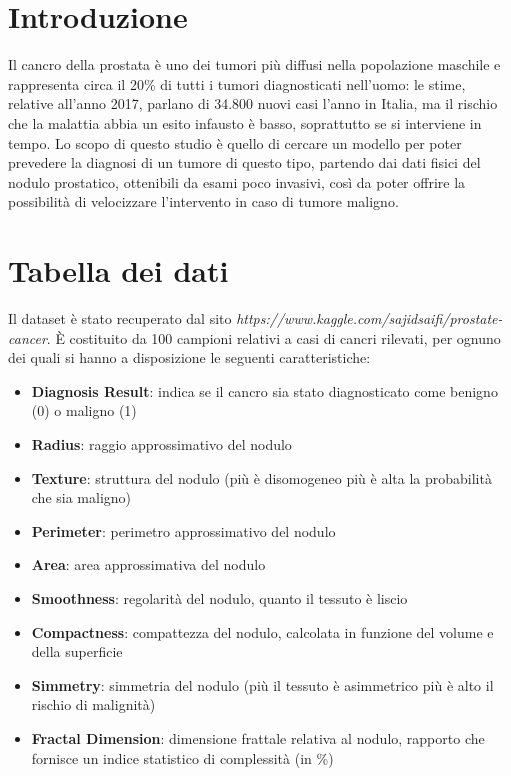 \documentclass[11pt,a4paper,oneside]{article}
\begin{document}
\baselineskip 12pt


\tableofcontents\thispagestyle{empty}\clearpage

\section{Introduzione}
Il cancro della prostata è uno dei tumori più diffusi nella popolazione maschile e rappresenta circa il 20\% di tutti i tumori diagnosticati nell'uomo: le stime, relative all'anno 2017, parlano di 34.800 nuovi casi l'anno in Italia, ma il rischio che la malattia abbia un esito infausto è basso, soprattutto se si interviene in tempo.
Lo scopo di questo studio è quello di cercare un modello per poter prevedere la diagnosi di un tumore di questo tipo, partendo dai dati fisici del nodulo prostatico, ottenibili da esami poco invasivi, così da poter offrire la possibilità di velocizzare l'intervento in caso di tumore maligno.

\section{Tabella dei dati}
Il dataset è stato recuperato dal sito \emph{https://www.kaggle.com/sajidsaifi/prostate-cancer}. È costituito da 100 campioni relativi a casi di cancri rilevati, per ognuno dei quali si hanno a disposizione le seguenti caratteristiche:
\begin{itemize}
\item \textbf{Diagnosis Result}: indica se il cancro sia stato diagnosticato come benigno (0) o maligno (1)
\item \textbf{Radius}: raggio approssimativo del nodulo
\item \textbf{Texture}: struttura del nodulo (più è disomogeneo più è alta la probabilità che sia maligno)
\item \textbf{Perimeter}: perimetro approssimativo del nodulo
\item \textbf{Area}: area approssimativa del nodulo
\item \textbf{Smoothness}: regolarità del nodulo, quanto il tessuto è liscio
\item \textbf{Compactness}: compattezza del nodulo, calcolata in funzione del volume e della superficie
\item \textbf{Simmetry}: simmetria del nodulo (più il tessuto è asimmetrico più è alto il rischio di malignità)
\item \textbf{Fractal Dimension}: dimensione frattale relativa al nodulo, rapporto che fornisce un indice statistico di complessità (in \%)
\end{itemize}
\end{document}
